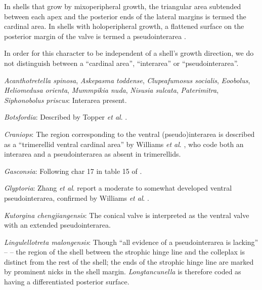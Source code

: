 \documentclass[openany]{book}
\theoremstyle{definition}
\theoremstyle{definition}
\theoremstyle{definition}
\theoremstyle{remark}
\begin{document}
In shells that grow by mixoperipheral growth, the triangular area
subtended between each apex and the posterior ends of the lateral
margins is termed the cardinal area. In shells with holoperipheral
growth, a flattened surface on the posterior margin of the valve is
termed a pseudointerarea
\citep[paraphrasing][]{Williams1997Introduction}.

In order for this character to be independent of a shell's growth
direction, we do not distinguish between a ``cardinal area'',
``interarea'' or ``pseudointerarea''.

\hypertarget{Acanthotretella_spinosa-coding-101}{}
\emph{Acanthotretella spinosa}, \emph{Askepasma toddense},
\emph{Clupeafumosus socialis}, \emph{Eoobolus}, \emph{Heliomedusa
orienta}, \emph{Mummpikia nuda}, \emph{Nisusia sulcata},
\emph{Paterimitra}, \emph{Siphonobolus priscus}: Interarea present.

\hypertarget{Botsfordia-coding-101}{}
\emph{Botsfordia}: Described by Topper \emph{et al}.
\citeyearpar{Topper2013Reappraisalof}.

\hypertarget{Craniops-coding-101}{}
\emph{Craniops}: The region corresponding to the ventral
(pseudo)interarea is described as a ``trimerellid ventral cardinal
area'' by Williams \emph{et al}.
\citeyearpar[p.162]{Williams2000LinguliformeaCraniiformea}, who code
both an interarea and a pseudointerarea as absent in trimerellids.

\hypertarget{Gasconsia-coding-101}{}
\emph{Gasconsia}: Following char 17 in table 15 of
\citet{Williams2000LinguliformeaCraniiformea}.

\hypertarget{Glyptoria-coding-101}{}
\emph{Glyptoria}: Zhang \emph{et al}.
\citeyearpar{Zhang2009Architectureand} report a moderate to somewhat
developed ventral pseudointerarea, confirmed by Williams \emph{et al}.
\citeyearpar{Williams2007Supplement}.

\hypertarget{Kutorgina_chengjiangensis-coding-101}{}
\emph{Kutorgina chengjiangensis}: The conical valve is interpreted as
the ventral valve with an extended pseudointerarea.

\hypertarget{Lingulellotreta_malongensis-coding-101}{}
\emph{Lingulellotreta malongensis}: Though ``all evidence of a
pseudointerarea is lacking'' -- \citet{Zhang2011Theexceptionally} -- the
region of the shell between the strophic hinge line and the colleplax
\citep[fig. 2 in][]{Zhang2011Theexceptionally} is distinct from the rest
of the shell; the ends of the strophic hinge line are marked by
prominent nicks in the shell margin. \emph{Longtancunella} is therefore
coded as having a differentiated posterior surface.
\end{document}
